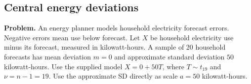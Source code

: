 \subsection{Central energy deviations}
\label{c8-i3}
\textbf{Problem.} An energy planner models household electricity forecast errors. Negative errors mean use below forecast. Let $X$ be household electricity use minus its forecast, measured in kilowatt-hours. A sample of 20 household forecasts has mean deviation $m=0$ and approximate standard deviation $50$ kilowatt-hours. Use the supplied model $X=0+50T$, where $T\sim t_{19}$ and $\nu=n-1=19$. Use the approximate SD directly as scale $a=50$ kilowatt-hours.

